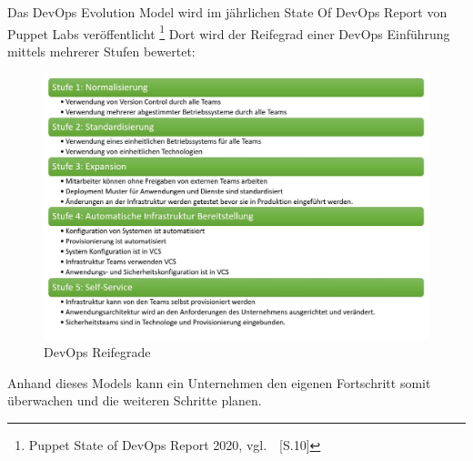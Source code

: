 Das DevOps Evolution Model wird im jährlichen State Of DevOps Report von Puppet Labs veröffentlicht \footnote{Puppet State of DevOps Report 2020, vgl.~\cite{PUPPET}~[S.10]}
Dort wird der Reifegrad einer DevOps Einführung mittels mehrerer Stufen bewertet:

\begin{figure}[htb]
    \centering
    \includegraphics[width=1.0\textwidth]{images/devops_reifegrad.jpg}
    \caption[DevOps Reifegrade]{DevOps Reifegrade}
    \label{fig:DevOps Reifegrade}
\end{figure}

Anhand dieses Models kann ein Unternehmen den eigenen Fortschritt somit überwachen und die weiteren Schritte planen.


